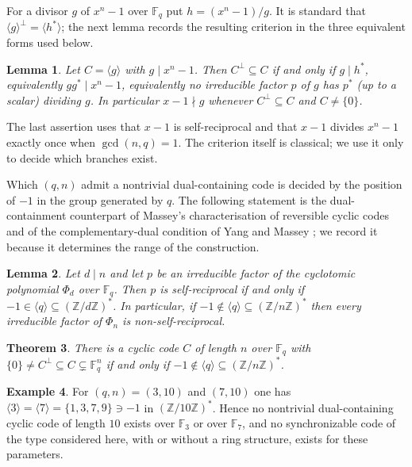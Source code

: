 \documentclass[11pt,reqno]{amsart}
\newtheorem{theorem}{Theorem}[section]
\newtheorem{lemma}[theorem]{Lemma}
\theoremstyle{definition}
\newtheorem{example}[theorem]{Example}
\theoremstyle{remark}
\newcommand{\F}{\mathbb{F}}
\newcommand{\Z}{\mathbb{Z}}
\newcommand{\gen}[1]{\langle #1\rangle}
\begin{document}
For a divisor $g$ of $x^n-1$ over $\F_q$ put $h=(x^n-1)/g$. It is standard that $\gen{g}^\perp=\gen{h^*}$; the next lemma records the resulting criterion in the three equivalent forms used below.


\begin{lemma}\label{dc}
Let $C=\gen{g}$ with $g\mid x^n-1$. Then $C^\perp\subseteq C$ if and only if $g\mid h^*$, equivalently $g g^*\mid x^n-1$, equivalently no irreducible factor $p$ of $g$ has $p^*$ (up to a scalar) dividing $g$. In particular $x-1\nmid g$ whenever $C^\perp\subseteq C$ and $C\neq\{0\}$.
\end{lemma}

The last assertion uses that $x-1$ is self-reciprocal and that $x-1$ divides $x^n-1$ exactly once when $\gcd(n,q)=1$. The criterion itself is classical; we use it only to decide which branches exist.


Which $(q,n)$ admit a nontrivial dual-containing code is decided by the position of $-1$ in the group generated by $q$. The following statement is the dual-containment counterpart of Massey's characterisation of reversible cyclic codes \cite{Massey1964} and of the complementary-dual condition of Yang and Massey \cite{YangMassey1994}; we record it because it determines the range of the construction.


\begin{lemma}\label{selfrecip}
Let $d\mid n$ and let $p$ be an irreducible factor of the cyclotomic polynomial $\Phi_d$ over $\F_q$. Then $p$ is self-reciprocal if and only if $-1\in\gen{q}\subseteq(\Z/d\Z)^*$. In particular, if $-1\notin\gen{q}\subseteq(\Z/n\Z)^*$ then every irreducible factor of $\Phi_n$ is non-self-reciprocal.
\end{lemma}

\begin{theorem}\label{existence}
There is a cyclic code $C$ of length $n$ over $\F_q$ with $\{0\}\neq C^\perp\subseteq C\subsetneq\F_q^n$ if and only if $-1\notin\gen{q}\subseteq(\Z/n\Z)^*$.
\end{theorem}

\begin{example}\label{nogo}
For $(q,n)=(3,10)$ and $(7,10)$ one has $\gen{3}=\gen{7}=\{1,3,7,9\}\ni-1$ in $(\Z/10\Z)^*$. Hence no nontrivial dual-containing cyclic code of length $10$ exists over $\F_3$ or over $\F_7$, and no synchronizable code of the type considered here, with or without a ring structure, exists for these parameters.
\end{example}
\end{document}
